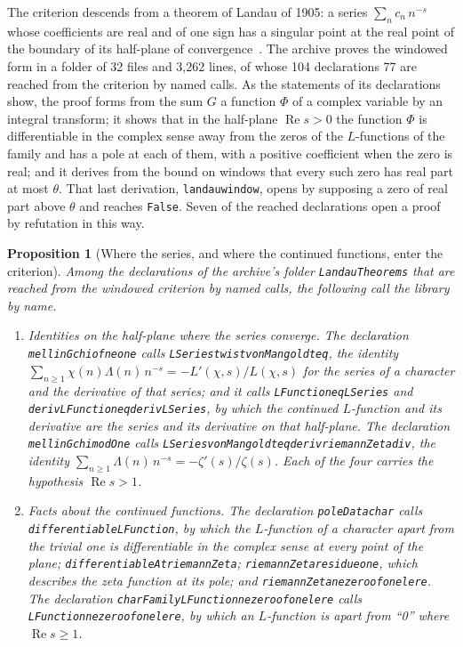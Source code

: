 \documentclass[11pt]{article}
\newtheorem{proposition}[theorem]{Proposition}
\theoremstyle{definition}
\theoremstyle{remark}
\newcommand{\re}{\operatorname{Re}}
\DeclareRobustCommand{\lean}[1]{{\renewcommand{\_}{\textunderscore\allowbreak}\texttt{#1}}}
\newcommand{\False}{\lean{False}}
\begin{document}
The criterion descends from a theorem of Landau of 1905: a series $\sum_n c_n\,n^{-s}$ whose coefficients are real and of one sign has a singular point at the real point of the boundary of its half-plane of convergence~\citep{landau05}. The archive proves the windowed form in a folder of 32 files and 3{,}262 lines, of whose 104 declarations 77 are reached from the criterion by named calls. As the statements of its declarations show, the proof forms from the sum $G$ a function $\Phi$ of a complex variable by an integral transform; it shows that in the half-plane $\re s>0$ the function $\Phi$ is differentiable in the complex sense away from the zeros of the $L$-functions of the family and has a pole at each of them, with a positive coefficient when the zero is real; and it derives from the bound on windows that every such zero has real part at most $\theta$. That last derivation, \lean{landau\_window}, opens by supposing a zero of real part above $\theta$ and reaches \False. Seven of the reached declarations open a proof by refutation in this way.

\begin{proposition}[Where the series, and where the continued functions, enter the criterion]\label{prop:enters}
Among the declarations of the archive's folder \lean{LandauTheorems} that are reached from the windowed criterion by named calls, the following call the library by name.
\begin{enumerate}[leftmargin=2em,itemsep=1pt]\sloppy
\item \emph{Identities on the half-plane where the series converge.} The declaration \lean{mellin\_Gchi\_of\_ne\_one} calls \lean{LSeries\_twist\_vonMangoldt\_eq}, the identity $\sum_{n\ge1}\chi(n)\Lambda(n)\,n^{-s}=-L'(\chi,s)/L(\chi,s)$ for the series of a character and the derivative of that series; and it calls \lean{LFunction\_eq\_LSeries} and \lean{deriv\_LFunction\_eq\_deriv\_LSeries}, by which the continued $L$-function and its derivative are the series and its derivative on that half-plane. The declaration \lean{mellin\_Gchi\_modOne} calls \lean{LSeries\_vonMangoldt\_eq\_deriv\_riemannZeta\_div}, the identity $\sum_{n\ge1}\Lambda(n)\,n^{-s}=-\zeta'(s)/\zeta(s)$. Each of the four carries the hypothesis $\re s>1$.
\item \emph{Facts about the continued functions.} The declaration \lean{poleData\_char} calls \lean{differentiable\_LFunction}, by which the $L$-function of a character apart from the trivial one is differentiable in the complex sense at every point of the plane; \lean{differentiableAt\_riemannZeta}; \lean{riemannZeta\_residue\_one}, which describes the zeta function at its pole; and \lean{riemannZeta\_ne\_zero\_of\_one\_le\_re}. The declaration \lean{charFamily\_LFunction\_ne\_zero\_of\_one\_le\_re} calls \lean{LFunction\_ne\_zero\_of\_one\_le\_re}, by which an $L$-function is apart from ``0'' where $\re s\ge1$.
\end{enumerate}
\end{proposition}
\end{document}
